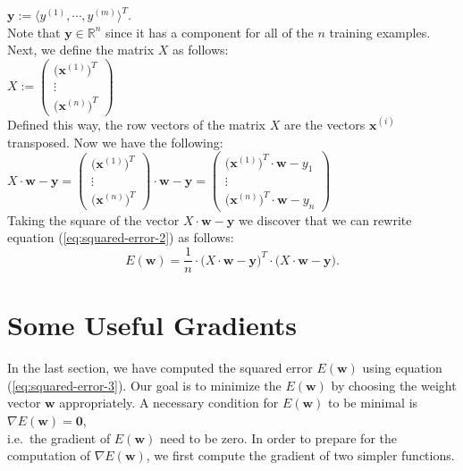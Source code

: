 \hspace*{1.3cm}
$\mathbf{y} := \langle y^{(1)}, \cdots, y^{(m)} \rangle^T$.
\\[0.2cm]
Note that $\mathbf{y} \in \mathbb{R}^n$ since it has a component for all of the $n$ training
examples.  Next, we define the matrix $X$ as follows:
\\[0.2cm]
\hspace*{1.3cm}
$X := \left(
  \begin{array}{c}
    \bigl(\mathbf{x}^{(1)}\bigr)^T  \\
    \vdots                         \\
    \bigl(\mathbf{x}^{(n)}\bigr)^T
  \end{array}
  \right)   
$
\\[0.2cm]
Defined this way, the row vectors of the matrix $X$ are the vectors $\mathbf{x}^{(i)}$ transposed.
Now we have the following:
\\[0.2cm]
\hspace*{1.3cm}
$X \cdot \mathbf{w} - \mathbf{y} = \left(
  \begin{array}{c}
    \bigl(\mathbf{x}^{(1)}\bigr)^T  \\
    \vdots                         \\
    \bigl(\mathbf{x}^{(n)}\bigr)^T
  \end{array}
  \right) \cdot \mathbf{w} - \mathbf{y} = \left(
  \begin{array}{c}
    \bigl(\mathbf{x}^{(1)}\bigr)^T \cdot \mathbf{w} - y_1 \\
    \vdots                         \\
    \bigl(\mathbf{x}^{(n)}\bigr)^T \cdot \mathbf{w} - y_n
  \end{array}
  \right)
$
\\[0.2cm]
Taking the square of the vector $X \cdot \mathbf{w} - \mathbf{y}$ we discover that
we can rewrite equation (\ref{eq:squared-error-2}) as follows:
\begin{equation}
  \label{eq:squared-error-3}
  E(\mathbf{w}) = \frac{1}{n} \cdot \bigl(X \cdot \mathbf{w} - \textbf{y}\bigr)^T \cdot 
                                    \bigl(X \cdot \mathbf{w} - \textbf{y}\bigr).
\end{equation}

\section{Some Useful Gradients}
In the last section, we have computed the squared error $E(\mathbf{w})$ using equation
(\ref{eq:squared-error-3}).  Our goal is to minimize the $E(\mathbf{w})$ by choosing the weight
vector $\mathbf{w}$ appropriately.  A necessary condition for $E(\mathbf{w})$ to be minimal is 
\\[0.2cm]
\hspace*{1.3cm}
$\nabla E(\mathbf{w}) = \mathbf{0}$,
\\[0.2cm]
i.e.~the gradient of $E(\mathbf{w})$ need to be zero.  In order to prepare for the computation of
$\nabla E(\mathbf{w})$, we first compute the gradient of two simpler functions.

